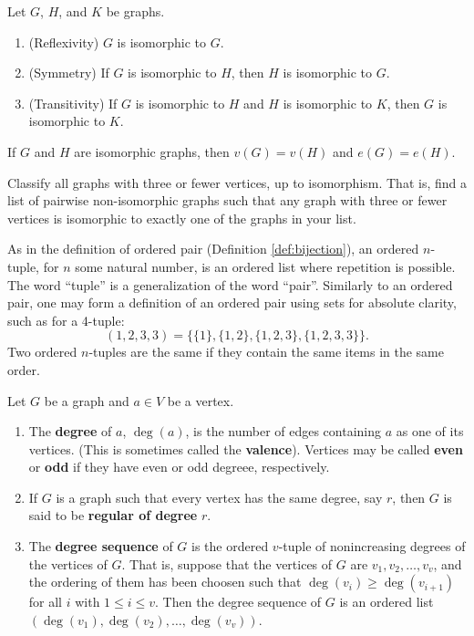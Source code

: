 \begin{theorem}  Let $G$, $H$, and $K$ be graphs.
\begin{enumerate}
    \item (Reflexivity) $G$ is isomorphic to $G$.
    \item (Symmetry) If $G$ is isomorphic to $H$, then $H$ is isomorphic to $G$.
    \item (Transitivity) If $G$ is isomorphic to $H$ and $H$ is isomorphic to $K$, then $G$ is isomorphic to $K$.
\end{enumerate}
\end{theorem}

\begin{corollary} If $G$ and $H$ are isomorphic graphs, then $v(G)=v(H)$ and $e(G)=e(H)$.
\end{corollary}

\begin{exercise} Classify all graphs with three or fewer vertices, up to isomorphism.  That is, find a list of pairwise non-isomorphic graphs such that any graph with three or fewer vertices is isomorphic to exactly one of the graphs in your list.
\end{exercise}

\begin{remark} As in the definition of ordered pair (Definition \ref{def:bijection}), an ordered $n$-tuple, for $n$ some natural number, is an ordered list where repetition is possible.  The word ``tuple'' is a generalization of the word ``pair''. Similarly to an ordered pair, one may form a definition of an ordered pair using sets for absolute clarity, such as for a 4-tuple: $$(1,2,3,3) = \{\{1\}, \{1,2\}, \{1,2,3\}, \{1,2,3,3\}\}.$$
Two ordered $n$-tuples are the same if they contain the same items in the same order.
\end{remark}

\begin{definition} Let $G$ be a graph and $a\in V$ be a vertex.
\begin{enumerate}
    \item The \textbf{degree} of $a$, $\deg(a)$, is the number of edges containing $a$ as one of its vertices.  (This is sometimes called the \textbf{valence}).  Vertices may be called \textbf{even} or \textbf{odd} if they have even or odd degreee, respectively.
    \item If $G$ is a graph such that every vertex has the same degree, say $r$, then $G$ is said to be \textbf{regular of degree} $r$.
    \item The \textbf{degree sequence} of $G$ is the ordered $v$-tuple of nonincreasing degrees of the vertices of $G$.  That is, suppose that the vertices of $G$ are $v_1, v_2, \ldots, v_v$, and the ordering of them has been choosen such that $\deg(v_i)\geq \deg(v_{i+1})$ for all $i$ with $1 \leq i \leq v$.  Then the degree sequence of $G$ is an ordered list $(\deg(v_1), \deg(v_2), \ldots, \deg(v_v))$.
\end{enumerate}
\end{definition}

